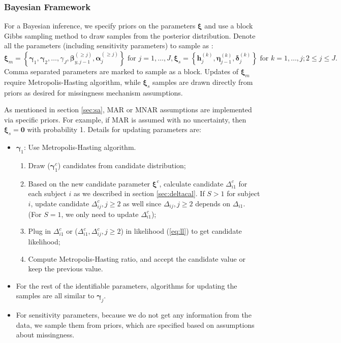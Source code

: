 \documentclass[12pt]{article}
\begin{document}
\subsubsection{Bayesian Framework}
\label{sec:bayesian}

For a Bayesian inference, we specify priors on the parameters $\bm
\xi$ and use a block Gibbs sampling method to draw samples from the
posterior distribution. Denote all the parameters (including
sensitivity parameters) to sample as :
\begin{displaymath}
  \bm \xi_m = \left\{ \bm \gamma_1, \bm \gamma_2, \ldots, \gamma_J,
    \bm \beta_{y,j-1}^{(\geq j)}, \bm \alpha_j^{(\geq j)} \right\}
    \text{ for } j = 1, \ldots, J ,
  \bm \xi_s = \left\{ \bm h_j^{(k)}, \bm \eta_{j-1}^{(k)}, \bm \delta_j^{(k)}
\right\}
    \text{ for } k = 1, \ldots, j; 2 \leq j \leq J.
\end{displaymath}
Comma separated parameters are marked to sample as a block.  Updates
of $\bm \xi_m$ require Metropolis-Hasting algorithm, while $\bm \xi_s$
samples are drawn directly from priors as desired for missingness
mechanism assumptions.

As mentioned in section \ref{sec:sa}, MAR or MNAR assumptions are
implemented via specific priors. For example, if MAR is assumed with
no uncertainty, then $ \bm \xi _s= \bm 0$ with probability 1. Details
for updating parameters are:

\begin{itemize}
\item $\bm \gamma_{1} $: Use Metropolis-Hasting algorithm.
  \begin{enumerate}
  \item Draw ($\bm \gamma_{1}^c$) candidates from candidate
    distribution;
  \item Based on the new candidate parameter $\bm \xi^c$, calculate
    candidate $\Delta_{i1}^c$ for each subject $i$ as we described in
    section \ref{sec:deltacal}. If $S > 1$ for subject $i$, update
    candidate $\Delta_{ij}^c, j \geq 2$ as well since $\Delta_{ij}, j
    \geq 2$ depends on $\Delta_{i1}$. (For $S = 1$, we only need to
    update $\Delta_{i1}^c$);
  \item Plug in $\Delta_{i1}^c$ or ($\Delta_{i1}^c, \Delta_{ij}^c, j
    \geq 2$) in likelihood (\ref{eq:ll}) to get candidate likelihood;
  \item Compute Metropolis-Hasting ratio, and accept the candidate
    value or keep the previous value.
  \end{enumerate}
\item For the rest of the identifiable parameters, algorithms for
  updating the samples are all similar to $\bm \gamma_j$.
\item For sensitivity parameters, because we do not get any
  information from the data, we sample them from priors, which are
  specified based on assumptions about  missingness.
\end{itemize}
\end{document}
